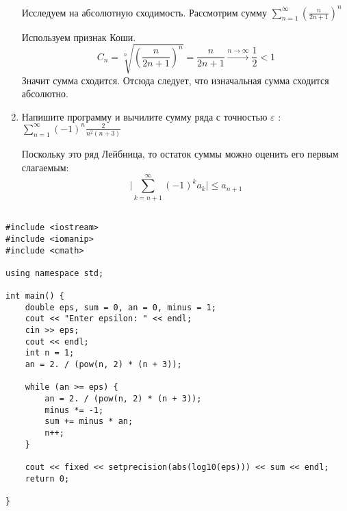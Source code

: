 \documentclass[10pt]{article} %
\begin{document}
\begin{large}
\begin{enumerate}
Исследуем на абсолютную сходимость. Рассмотрим сумму $ \sum\limits_{n=1}^{\infty}{ \left( \frac{n}{2n+1} \right)^{n} }$

Используем признак Коши.
\[ C_{n} = \sqrt[n]{\left( \frac{n}{2n+1} \right)^{n} } = \frac{n}{2n+1} \xrightarrow{n\to\infty} \frac{1}{2} < 1 \]
Значит сумма сходится. Отсюда следует, что изначальная сумма сходится абсолютно.

\item Напишите программу и вычилите сумму ряда с точностью $\varepsilon$ : $ \sum\limits_{n=1}^{\infty}{ (-1)^{n} \frac{2}{n^2(n+3)}  }$

Поскольку это ряд Лейбница, то остаток суммы можно оценить его первым слагаемым:  
\[ \bigg\vert \sum\limits_{k=n+1}^{\infty}{ (-1)^{k} a_{k} } \bigg\vert \le a_{n+1}  \]

\end{enumerate}

\begin{verbatim}

#include <iostream>
#include <iomanip>
#include <cmath>

using namespace std;

int main() {
    double eps, sum = 0, an = 0, minus = 1;
    cout << "Enter epsilon: " << endl;
    cin >> eps;
    cout << endl;
    int n = 1;
    an = 2. / (pow(n, 2) * (n + 3));

    while (an >= eps) {
        an = 2. / (pow(n, 2) * (n + 3));
        minus *= -1;
        sum += minus * an;
        n++;
    }

    cout << fixed << setprecision(abs(log10(eps))) << sum << endl;
    return 0;

}

\end{verbatim}

\end{large}  
\end{document}
